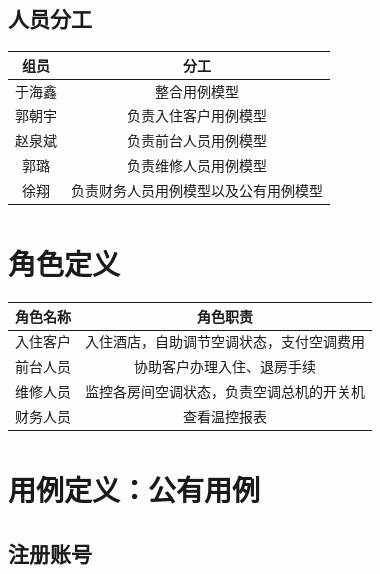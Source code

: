 \documentclass[black,normal,cn]{elegantnote}
\begin{document}
\subsection{人员分工}

\begin{center}
    \begin{tabular}{cc}
        \toprule
        \textbf{组员} & \textbf{分工}                        \\
        \midrule
        于海鑫        & 整合用例模型                         \\
        郭朝宇        & 负责入住客户用例模型                 \\
        赵泉斌        & 负责前台人员用例模型                 \\
        郭璐          & 负责维修人员用例模型                 \\
        徐翔          & 负责财务人员用例模型以及公有用例模型 \\
        \bottomrule
    \end{tabular}
\end{center}

\section{角色定义}

\begin{center}
    \begin{tabular}{cc}
        \toprule
        \textbf{角色名称} & \textbf{角色职责}                        \\
        \midrule
        入住客户          & 入住酒店，自助调节空调状态，支付空调费用 \\
        前台人员          & 协助客户办理入住、退房手续               \\
        维修人员          & 监控各房间空调状态，负责空调总机的开关机 \\
        财务人员          & 查看温控报表                             \\
        \bottomrule
    \end{tabular}
\end{center}

\section{用例定义：公有用例}

\subsection{注册账号}
\end{document}
